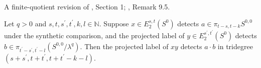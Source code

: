 \begin{theorem}
\label{frontier:Literature:5ea1d02075a4}
A finite-quotient revision of \cite{Moss}, Section 1; \cite{BHS}, Remark 9.5.\par

Let $q>0$ and $s,t,s^{\prime},t^{\prime},k,l\in\mathbb N$. Suppose $x\in E_2^{s,t}(S^0)$ detects $a\in\pi_{t-s,t-k}S^{0,0}$ under the synthetic comparison, and the projected label of $y\in E_2^{s^{\prime},t^{\prime}}(S^0)$ detects $b\in\pi_{t^{\prime}-s^{\prime},t^{\prime}-l}(S^{0,0}/\lambda^q)$. Then the projected label of $xy$ detects $a\cdot b$ in tridegree $(s+s^{\prime},t+t^{\prime},t+t^{\prime}-k-l)$.
\end{theorem}

